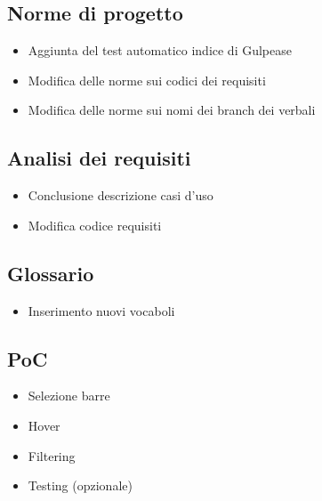 \subsection{Norme di progetto}
\begin{itemize}
    \item Aggiunta del test automatico indice di Gulpease
    \item Modifica delle norme sui codici dei requisiti
    \item Modifica delle norme sui nomi dei branch dei verbali
\end{itemize}

\subsection{Analisi dei requisiti}
\begin{itemize}
    \item Conclusione descrizione casi d'uso
    \item Modifica codice requisiti
\end{itemize}

\subsection{Glossario}
\begin{itemize}
    \item Inserimento nuovi vocaboli
\end{itemize}

\subsection{PoC}
\begin{itemize}
    \item Selezione barre
    \item Hover
    \item Filtering
    \item Testing (opzionale)
\end{itemize}
